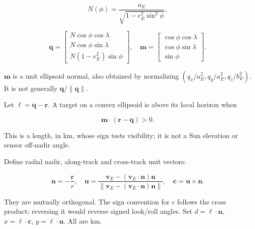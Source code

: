 \documentclass[10pt,a4paper]{article}
\numberwithin{equation}{section}
\begin{document}
\begin{equation}N(\phi)=\frac{a_E}{\sqrt{1-e_E^2\sin^2\phi}},\label{eq:ch7-1}\end{equation}

\begin{equation}\mathbf q=
\begin{bmatrix}N\cos\phi\cos\lambda\\N\cos\phi\sin\lambda\\
N(1-e_E^2)\sin\phi\end{bmatrix},\quad
\mathbf m=
\begin{bmatrix}\cos\phi\cos\lambda\\\cos\phi\sin\lambda\\\sin\phi\end{bmatrix}.\label{eq:ch7-2}\end{equation}

\begin{sloppypar}\(\mathbf m\) is a unit ellipsoid normal, also obtained by normalizing \((q_x/a_E^2,q_y/a_E^2,q_z/b_E^2)\). It is not generally \(\mathbf q/\|\mathbf q\|\).\end{sloppypar}


\begin{sloppypar}Let \(\boldsymbol\ell=\mathbf q-\mathbf r\). A target on a convex ellipsoid is above its local horizon when\end{sloppypar}


\begin{equation}\mathbf m\cdot(\mathbf r-\mathbf q)>0.\label{eq:ch7-3}\end{equation}

\begin{sloppypar}This is a length, in km, whose sign tests visibility; it is not a Sun elevation or sensor off-nadir angle.\end{sloppypar}


\begin{sloppypar}Define radial nadir, along-track and cross-track unit vectors:\end{sloppypar}


\begin{equation}\mathbf n=-\frac{\mathbf r}{r},\quad
\mathbf u=\frac{\mathbf v_E-(\mathbf v_E\cdot\mathbf n)\mathbf n}
{\|\mathbf v_E-(\mathbf v_E\cdot\mathbf n)\mathbf n\|},\quad
\mathbf c=\mathbf u\times\mathbf n.\label{eq:ch7-4}\end{equation}

\begin{sloppypar}They are mutually orthogonal. The sign convention for c follows the cross product; reversing it would reverse signed look/roll angles. Set \(d=\boldsymbol\ell\cdot\mathbf n\), \(x=\boldsymbol\ell\cdot\mathbf c\), \(y=\boldsymbol\ell\cdot\mathbf u\). All are km.\end{sloppypar}
\end{document}
